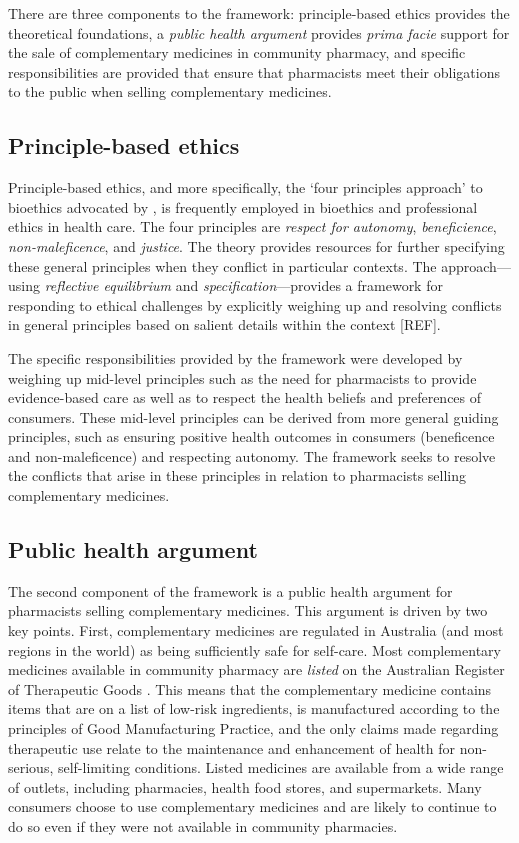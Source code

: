 \documentclass[11pt,a4paper]{article}
\begin{document}
There are three components to the framework: principle-based ethics
provides the theoretical foundations, a \emph{public health argument}
provides \emph{prima facie} support for the sale of complementary
medicines in community pharmacy, and specific responsibilities are
provided that ensure that pharmacists meet their obligations to the
public when selling complementary medicines.

\subsection{Principle-based ethics}\label{principle-based-ethics}

Principle-based ethics, and more specifically, the `four principles
approach' to bioethics advocated by \textcite{Beauchamp2012}, is
frequently employed in bioethics and professional ethics in health care.
The four principles are \emph{respect for autonomy},
\emph{beneficience}, \emph{non-maleficence}, and \emph{justice}. The
theory provides resources for further specifying these general
principles when they conflict in particular contexts. The
approach---using \emph{reflective equilibrium} and
\emph{specification}---provides a framework for responding to ethical
challenges by explicitly weighing up and resolving conflicts in general
principles based on salient details within the context {[}REF{]}.

The specific responsibilities provided by the framework were developed
by weighing up mid-level principles such as the need for pharmacists to
provide evidence-based care as well as to respect the health beliefs and
preferences of consumers. These mid-level principles can be derived from
more general guiding principles, such as ensuring positive health
outcomes in consumers (beneficence and non-maleficence) and respecting
autonomy. The framework seeks to resolve the conflicts that arise in
these principles in relation to pharmacists selling complementary
medicines.

\subsection{Public health argument}\label{public-health-argument}

The second component of the framework is a public health argument for
pharmacists selling complementary medicines. This argument is driven by
two key points. First, complementary medicines are regulated in
Australia (and most regions in the world) as being sufficiently safe for
self-care. Most complementary medicines available in community pharmacy
are \emph{listed} on the Australian Register of Therapeutic Goods
\autocite{TGA2019_listed}. This means that the complementary medicine
contains items that are on a list of low-risk ingredients, is
manufactured according to the principles of Good Manufacturing Practice,
and the only claims made regarding therapeutic use relate to the
maintenance and enhancement of health for non-serious, self-limiting
conditions. Listed medicines are available from a wide range of outlets,
including pharmacies, health food stores, and supermarkets. Many
consumers choose to use complementary medicines and are likely to
continue to do so even if they were not available in community
pharmacies.
\end{document}
